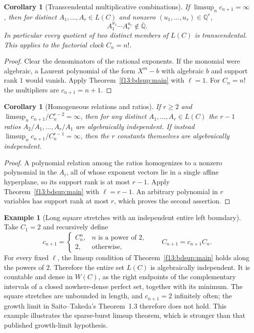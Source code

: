 \documentclass[11pt,a4paper]{article}
\newtheorem{corollary}[theorem]{Corollary}
\theoremstyle{definition}
\newtheorem{example}[theorem]{Example}
\theoremstyle{remark}
\numberwithin{equation}{section}
\begin{document}
\begin{corollary}[Transcendental multiplicative combinations]
\label{f13:bdsup:monomials}
If $\limsup_n c_{n+1}=\infty$, then for distinct
$A_1,\ldots,A_r\in L(C)$ and nonzero
$(u_1,\ldots,u_r)\in\mathbb Q^r$,
\[
 \boxed{A_1^{u_1}\cdots A_r^{u_r}\notin\overline{\mathbb Q}.}
\]
In particular every quotient of two distinct members of $L(C)$ is
transcendental. This applies to the factorial clock $C_n=n!$.
\end{corollary}
\begin{proof}
Clear the denominators of the rational exponents. If the monomial were
algebraic, a Laurent polynomial of the form $X^m-b$ with algebraic $b$
and support rank $1$ would vanish. Apply Theorem~\ref{f13:bdsup:main} with
$\ell=1$. For $C_n=n!$ the multipliers are $c_{n+1}=n+1$.
\end{proof}

\begin{corollary}[Homogeneous relations and ratios]
\label{f13:bdsup:ratios}
If $r\ge2$ and
$\limsup_n c_{n+1}/C_n^{r-2}=\infty$, then for any distinct
$A_1,\ldots,A_r\in L(C)$ the $r-1$ ratios
$A_2/A_1,\ldots,A_r/A_1$ are algebraically independent.
If instead $\limsup_n c_{n+1}/C_n^{r-1}=\infty$, then the $r$ constants
themselves are algebraically independent.
\end{corollary}
\begin{proof}
A polynomial relation among the ratios homogenizes to a nonzero
polynomial in the $A_i$, all of whose exponent vectors lie in a single
affine hyperplane, so its support rank is at most $r-1$.
Apply Theorem~\ref{f13:bdsup:main} with $\ell=r-1$.
An arbitrary polynomial in $r$ variables has support rank at most $r$,
which proves the second assertion.
\end{proof}

\begin{example}[Long square stretches with an independent entire left boundary]
Take $C_1=2$ and recursively define
\[
 c_{n+1}=\begin{cases}
 C_n^n,&n\text{ is a power of }2,\\
 2,&\text{otherwise},
 \end{cases}
 \qquad C_{n+1}=c_{n+1}C_n.
\]
For every fixed $\ell$, the limsup condition of
Theorem~\ref{f13:bdsup:main} holds along the powers of $2$. Therefore the
entire set $L(C)$ is algebraically independent. It is countable and
dense in $W(C)$, as the right endpoints of the complementary intervals
of a closed nowhere-dense perfect set, together with its minimum.
The square stretches are unbounded in length, and $c_{n+1}=2$
infinitely often; the growth limit in Saito--Takeda's Theorem~1.3
therefore does not hold. This example illustrates the sparse-burst
limsup theorem, which is stronger than that published growth-limit
hypothesis.
\end{example}
\end{document}
